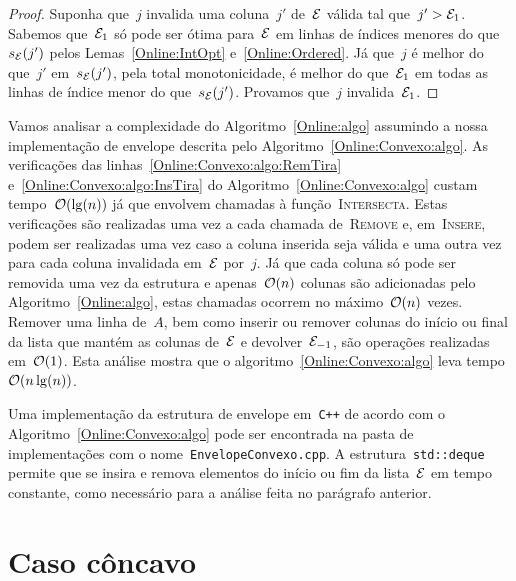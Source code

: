 \begin{proof}
Suponha que~$j$ invalida uma coluna~$j'$ de~$\mathcal{E}$ válida tal que~$j' > \mathcal{E}_1$. Sabemos que~$\mathcal{E}_1$ só pode ser ótima para~$\mathcal{E}$ em linhas de índices menores do que~$s_{\mathcal{E}}(j')$ pelos Lemas~\ref{Online:IntOpt} e~\ref{Online:Ordered}. Já que~$j$ é melhor do que~$j'$ em~$s_{\mathcal{E}}(j')$, pela total monotonicidade, é melhor do que~$\mathcal{E}_1$ em todas as linhas de índice menor do que~$s_{\mathcal{E}}(j')$. Provamos que~$j$ invalida~$\mathcal{E}_1$.
\end{proof}

Vamos analisar a complexidade do Algoritmo~\ref{Online:algo} assumindo a nossa implementação de envelope descrita pelo Algoritmo~\ref{Online:Convexo:algo}. As verificações das linhas~\ref{Online:Convexo:algo:RemTira} e~\ref{Online:Convexo:algo:InsTira} do Algoritmo~\ref{Online:Convexo:algo} custam tempo~$\mathcal{O}(\lg(n))$ já que envolvem chamadas à função~\textsc{Intersecta}. Estas verificações são realizadas uma vez a cada chamada de~\textsc{Remove} e, em~\textsc{Insere}, podem ser realizadas uma vez caso a coluna inserida seja válida e uma outra vez para cada coluna invalidada em~$\mathcal{E}$ por~$j$. Já que cada coluna só pode ser removida uma vez da estrutura e apenas~$\mathcal{O}(n)$ colunas são adicionadas pelo Algoritmo~\ref{Online:algo}, estas chamadas ocorrem no máximo~$\mathcal{O}(n)$ vezes. Remover uma linha de~$A$, bem como inserir ou remover colunas do início ou final da lista que mantém as colunas de~$\mathcal{E}$ e devolver~$\mathcal{E}_{-1}$, são operações realizadas em~$\mathcal{O}(1)$. Esta análise mostra que o algoritmo~\ref{Online:Convexo:algo} leva tempo~$\mathcal{O}(n\lg(n))$.

Uma implementação da estrutura de envelope em~\texttt{C++} de acordo com o Algoritmo~\ref{Online:Convexo:algo} pode ser encontrada na pasta de implementações com o nome~\texttt{EnvelopeConvexo.cpp}. A estrutura~\texttt{std::deque} permite que se insira e remova elementos do início ou fim da lista~$\mathcal{E}$ em tempo constante, como necessário para a análise feita no parágrafo anterior.


\section{Caso côncavo} \label{Online:concave}

